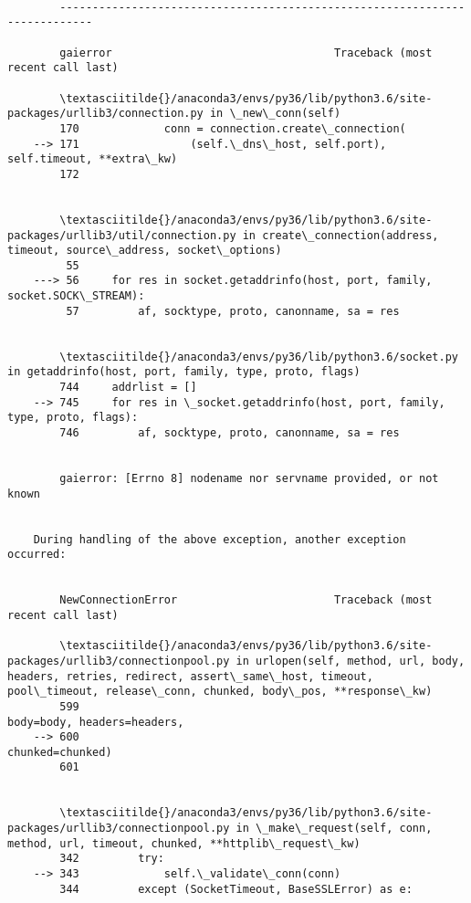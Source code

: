 \documentclass[11pt]{article}
\begin{document}
    \begin{Verbatim}[commandchars=\\\{\}]

        ---------------------------------------------------------------------------

        gaierror                                  Traceback (most recent call last)

        \textasciitilde{}/anaconda3/envs/py36/lib/python3.6/site-packages/urllib3/connection.py in \_new\_conn(self)
        170             conn = connection.create\_connection(
    --> 171                 (self.\_dns\_host, self.port), self.timeout, **extra\_kw)
        172 


        \textasciitilde{}/anaconda3/envs/py36/lib/python3.6/site-packages/urllib3/util/connection.py in create\_connection(address, timeout, source\_address, socket\_options)
         55 
    ---> 56     for res in socket.getaddrinfo(host, port, family, socket.SOCK\_STREAM):
         57         af, socktype, proto, canonname, sa = res


        \textasciitilde{}/anaconda3/envs/py36/lib/python3.6/socket.py in getaddrinfo(host, port, family, type, proto, flags)
        744     addrlist = []
    --> 745     for res in \_socket.getaddrinfo(host, port, family, type, proto, flags):
        746         af, socktype, proto, canonname, sa = res


        gaierror: [Errno 8] nodename nor servname provided, or not known

        
    During handling of the above exception, another exception occurred:


        NewConnectionError                        Traceback (most recent call last)

        \textasciitilde{}/anaconda3/envs/py36/lib/python3.6/site-packages/urllib3/connectionpool.py in urlopen(self, method, url, body, headers, retries, redirect, assert\_same\_host, timeout, pool\_timeout, release\_conn, chunked, body\_pos, **response\_kw)
        599                                                   body=body, headers=headers,
    --> 600                                                   chunked=chunked)
        601 


        \textasciitilde{}/anaconda3/envs/py36/lib/python3.6/site-packages/urllib3/connectionpool.py in \_make\_request(self, conn, method, url, timeout, chunked, **httplib\_request\_kw)
        342         try:
    --> 343             self.\_validate\_conn(conn)
        344         except (SocketTimeout, BaseSSLError) as e:



\end{Verbatim}
\end{document}
